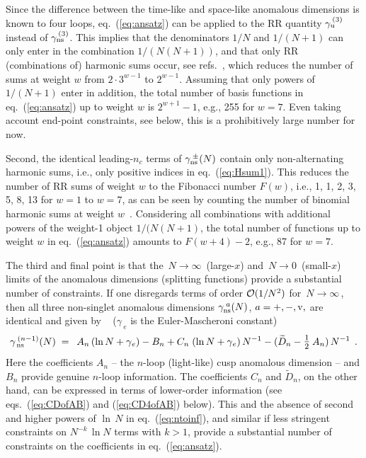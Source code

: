 \documentclass[12pt]{article}
\newcommand{\beq}{\begin{equation}}
\newcommand{\eeq}{\end{equation}}
\def\frct#1#2{\mbox{\large{$\frac{#1}{#2}$}}}
\def\nc{{n_c}}
\begin{document}
Since the difference between the time-like and space-like anomalous 
dimensions is known to four loops, eq.~(\ref{eq:ansatz}) can be applied to 
the RR quantity $\gamma_{\rm u}^{\,(3)}$ instead of $\gamma_{\rm ns}^{\,(3)}$.
This implies that the denominators $1/N$ and $1/(N+1)$ can only enter in the 
combination $1/(N(N+1))$, and that only RR (combinations of) harmonic sums
occur, see refs.~\cite{Lukowski:2009ce,wwwVelizh}, which reduces the number 
of sums at weight $w$ from $2\cdot 3^{w-1}$ to $2^{w-1}$. 
Assuming that only powers of $1/(N+1)$ enter in addition, the total number of 
basis functions in eq.~(\ref{eq:ansatz}) up to weight $w$ is $2^{w+1}-1$, e.g.,
255 for $w=7$.
Even taking account end-point constraints, see below, this is a prohibitively
large number for now.

Second, the identical leading-$\nc$ terms of $\gamma_{\rm ns}^{\:\pm}(N)$
contain only non-alternating harmonic sums,
i.e., only positive indices in eq.~(\ref{eq:Hsum1}). This reduces the number 
of RR sums of weight $w$ to the Fibonacci number $F(w)$, i.e., 1, 1, 2, 3, 5,
8, 13 for $w=1$ to $w=7$, 
as can be seen by counting the number of binomial harmonic sums 
at weight $w$~\cite{Lukowski:2009ce}.
Considering all combinations with additional powers of the weight-1 object $1/(N(N+1)$,
the total number of functions up to weight $w$ in 
eq.~(\ref{eq:ansatz}) amounts to $F(w+4) -2$, e.g., 87 for $w=7$.


The third and final point is that the $\,N\to \infty\,$ (large-$x$) and 
$\,N\to 0\,$ (small-$x$) limits of the anomalous dimensions (splitting 
functions) provide a substantial number of constraints. If one disregards
terms of order ${\cal O}(1/N^2)$ for $\,N\to \infty\,$, then all three
non-singlet anomalous dimensions $\gamma_{\rm ns}^{\;a}(N)$, $a = +,-,\rm v,$
are identical and given by \cite{Dokshitzer:2005bf}~
($\gamma_{\:\!e}$ is the Euler-Mascheroni constant)
%
\beq
\label{eq:ntoinf}
  \gamma_{\,\rm ns}^{\:(n-1)}(N) \; = \:\;
    A_n \, ( \ln N +\gamma_{\:\!e} ) - B_n
  + C_n \; ( \ln N + \gamma_{\:\!e} ) \, N^{-1}
  - ( \widetilde{D}_n - \frct{1}{2}\: A_n ) \, N^{-1}
\:\: .
\eeq
%
Here the coefficients $A_n$ -- the $n$-loop (light-like) cusp anomalous 
dimension -- and $B_n$ provide genuine $n$-loop information. 
The coefficients $C_n$ and $\widetilde{D}_n$, on the other hand, can be 
expressed in terms of lower-order information (see eqs.~(\ref{eq:CDofAB}) and
(\ref{eq:CD4ofAB}) below). 
This and the absence of second and higher powers of $\ln\, N$ in 
eq.~(\ref{eq:ntoinf}), and similar if less stringent constraints on 
$N^{-k}\,\ln N$ terms with $k>1$, provide a substantial number of constraints 
on the coefficients in eq.~(\ref{eq:ansatz}).
\end{document}
